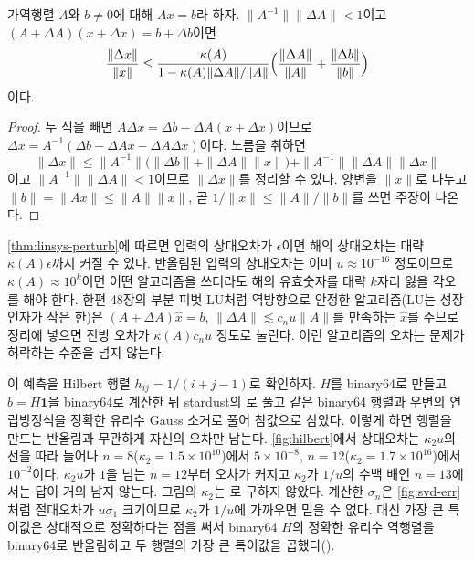 \begin{theorem}
\label{thm:linsys-perturb}
가역행렬 $A$와 $b\ne0$에 대해 $Ax=b$라 하자. $\|A^{-1}\|\|\Delta A\|<1$이고 $(A+\Delta A)(x+\Delta x)=b+\Delta b$이면
\[
\frac{\|\Delta x\|}{\|x\|}\le\frac{\kappa(A)}{1-\kappa(A)\|\Delta A\|/\|A\|}\Bigl(\frac{\|\Delta A\|}{\|A\|}+\frac{\|\Delta b\|}{\|b\|}\Bigr)
\]
이다.
\end{theorem}

\begin{proof}
두 식을 빼면 $A\Delta x=\Delta b-\Delta A(x+\Delta x)$이므로 $\Delta x=A^{-1}(\Delta b-\Delta Ax-\Delta A\Delta x)$이다. 노름을 취하면
\[
\|\Delta x\|\le\|A^{-1}\|\bigl(\|\Delta b\|+\|\Delta A\|\|x\|\bigr)+\|A^{-1}\|\|\Delta A\|\|\Delta x\|
\]
이고 $\|A^{-1}\|\|\Delta A\|<1$이므로 $\|\Delta x\|$를 정리할 수 있다. 양변을 $\|x\|$로 나누고 $\|b\|=\|Ax\|\le\|A\|\|x\|$, 곧 $1/\|x\|\le\|A\|/\|b\|$를 쓰면 주장이 나온다.
\end{proof}

\cref{thm:linsys-perturb}에 따르면 입력의 상대오차가 $\epsilon$이면 해의 상대오차는 대략 $\kappa(A)\epsilon$까지 커질 수 있다. 반올림된 입력의 상대오차는 이미 $u\approx10^{-16}$ 정도이므로 $\kappa(A)\approx10^{k}$이면 어떤 알고리즘을 쓰더라도 해의 유효숫자를 대략 $k$자리 잃을 각오를 해야 한다. 한편 48장의 부분 피벗 LU처럼 역방향으로 안정한 알고리즘(LU는 성장 인자가 작은 한)은 $(A+\Delta A)\hat x=b$, $\|\Delta A\|\lesssim c_nu\|A\|$를 만족하는 $\hat x$를 주므로 정리에 넣으면 전방 오차가 $\kappa(A)c_nu$ 정도로 눌린다. 이런 알고리즘의 오차는 문제가 허락하는 수준을 넘지 않는다.

이 예측을 Hilbert 행렬 $h_{ij}=1/(i+j-1)$로 확인하자. $H$를 binary64로 만들고 $b=H\mathbf1$을 binary64로 계산한 뒤 stardust의 로 풀고 같은 binary64 행렬과 우변의 연립방정식을 정확한 유리수 Gauss 소거로 풀어 참값으로 삼았다. 이렇게 하면 행렬을 만드는 반올림과 무관하게  자신의 오차만 남는다. \cref{fig:hilbert}에서 상대오차는 $\kappa_2u$의 선을 따라 늘어나 $n=8$($\kappa_2=1.5\times10^{10}$)에서 $5\times10^{-8}$, $n=12$($\kappa_2=1.7\times10^{16}$)에서 $10^{-2}$이다. $\kappa_2u$가 $1$을 넘는 $n=12$부터 오차가 커지고 $\kappa_2$가 $1/u$의 수백 배인 $n=13$에서는 답이 거의 남지 않는다. 그림의 $\kappa_2$는 로 구하지 않았다. 계산한 $\sigma_n$은 \cref{fig:svd-err}처럼 절대오차가 $u\sigma_1$ 크기이므로 $\kappa_2$가 $1/u$에 가까우면 믿을 수 없다. 대신 가장 큰 특이값은 상대적으로 정확하다는 점을 써서 binary64 $H$의 정확한 유리수 역행렬을 binary64로 반올림하고 두 행렬의 가장 큰 특이값을 곱했다().

